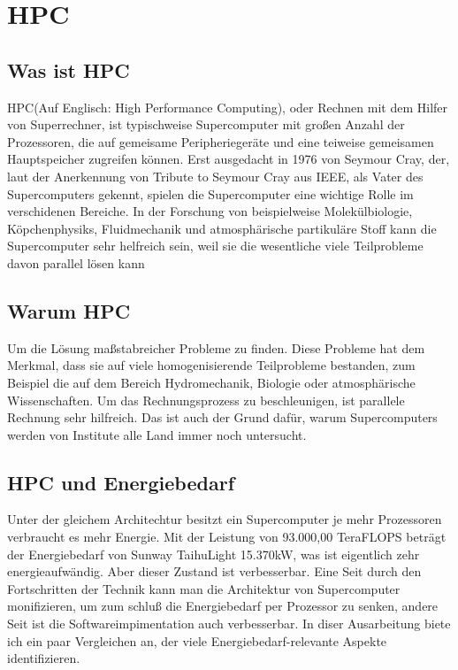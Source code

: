 \chapter{HPC}
\label{chap:HPC}

\section{Was ist HPC}
\label{sec:Was ist HPC}
HPC(Auf Englisch: High Performance Computing), oder Rechnen mit dem Hilfer von Superrechner, ist typischweise Supercomputer mit großen Anzahl der Prozessoren, die auf gemeisame Peripheriegeräte und eine teiweise gemeisamen Hauptspeicher zugreifen können. Erst ausgedacht in 1976 von Seymour Cray, der, laut der Anerkennung von Tribute to Seymour Cray aus IEEE, als Vater des Supercomputers gekennt, spielen die Supercomputer eine wichtige Rolle im verschidenen Bereiche. In der Forschung von beispielweise Molekülbiologie, Köpchenphysiks, Fluidmechanik und atmosphärische partikuläre Stoff kann die Supercomputer sehr helfreich sein, weil sie die wesentliche viele Teilprobleme davon parallel lösen kann

\section{Warum HPC}
\label{sec:Warum HPC}
Um die Lösung maßstabreicher Probleme zu finden. Diese Probleme hat dem Merkmal, dass sie auf viele homogenisierende Teilprobleme bestanden, zum Beispiel die auf dem Bereich Hydromechanik, Biologie oder atmosphärische Wissenschaften. Um das Rechnungsprozess zu beschleunigen, ist parallele Rechnung sehr hilfreich. Das ist auch der Grund dafür, warum Supercomputers werden von Institute alle Land immer noch untersucht.

\section{HPC und Energiebedarf}
\label{sec:HPC und Energiebedarf}
Unter der gleichem Architechtur besitzt ein Supercomputer je mehr Prozessoren verbraucht es mehr Energie. Mit der Leistung von 93.000,00 TeraFLOPS beträgt der Energiebedarf von Sunway TaihuLight 15.370kW, was ist eigentlich zehr energieaufwändig. Aber dieser Zustand ist verbesserbar. Eine Seit durch den Fortschritten der Technik kann man die Architektur von Supercomputer monifizieren, um zum schluß die Energiebedarf per Prozessor zu senken, andere Seit ist die Softwareimpimentation auch verbesserbar. In diser Ausarbeitung biete ich ein paar Vergleichen an, der viele Energiebedarf-relevante Aspekte identifizieren.
